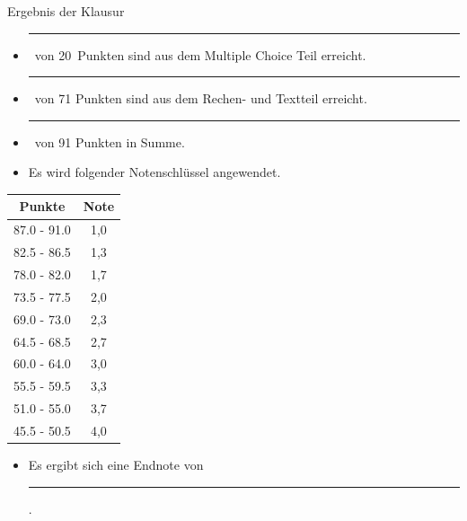 \documentclass[a4paper, 9pt]{scrartcl}\usepackage[]{graphicx}\usepackage[]{xcolor}
\begin{document}
\begin{graybox}{Ergebnis der Klausur}
  \vspace{1Ex}
  \begin{itemize}
  \item[] \rule[0ex]{3em}{.4pt}\, von 20\, Punkten sind aus dem Multiple
    Choice Teil erreicht.
  \item[] \rule[0ex]{3em}{.4pt}\, von 71 Punkten sind aus dem Rechen- und
    Textteil erreicht. 
  \item[] \rule[0ex]{3em}{.4pt}\, von 91 Punkten in Summe.
  \item[] Es wird folgender Notenschlüssel angewendet.   
  \end{itemize}
  \vspace{1ex}
\begin{center}
  \begin{tabular}[c]{cc}
    \toprule
    \textbf{Punkte}	&	\textbf{Note}	\\
    \midrule
    87.0 - 91.0	&	1,0	\\
    82.5 - 86.5	&	1,3	\\
    78.0 - 82.0	&	1,7	\\
    73.5 - 77.5	&	2,0	\\
    69.0 - 73.0	&	2,3	\\
    64.5 - 68.5	&	2,7	\\
    60.0 - 64.0	&	3,0	\\
    55.5 - 59.5	&	3,3	\\
    51.0 - 55.0	&	3,7	\\
    45.5 - 50.5	&	4,0	\\
    \bottomrule
  \end{tabular}
\end{center}
  \vspace{1ex}
\begin{itemize}
\item[] Es ergibt sich eine Endnote von \rule[0ex]{4em}{.4pt}.
\end{itemize}
  \vspace{1Ex}
\end{graybox}

\newpage
\end{document}
